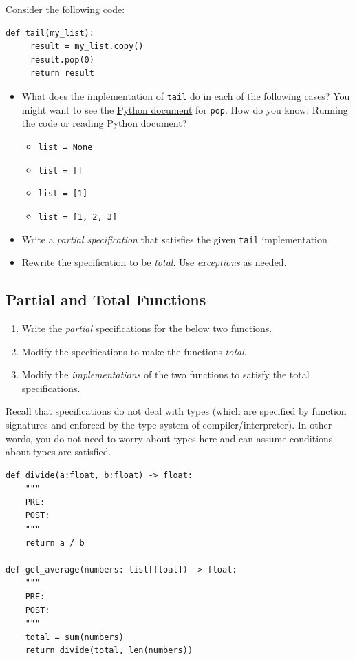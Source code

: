 \documentclass[oneside,11pt,dvipsnames]{book}
\newcommand{\code}[1]{\texttt{#1}}
\begin{document}
Consider the following code:

\begin{lstlisting}
def tail(my_list):
     result = my_list.copy()
     result.pop(0)
     return result
\end{lstlisting}

\begin{itemize}
     \item What does the implementation of \code{tail} do in each of the following cases? You might want to see the \href{https://docs.python.org/3/tutorial/datastructures.html}{Python document} for \code{pop}.  How do you know: Running the code or reading Python document?
     \begin{itemize}
         \item \code{list = None}
         \item \code{list = []}
         \item \code{list = [1]}  
         \item \code{list = [1, 2, 3]}
     \end{itemize}
     \item Write a \emph{partial specification} that satisfies the given \code{tail} implementation
     \item Rewrite the specification to be \emph{total}. Use \emph{exceptions} as needed.
    \end{itemize}

\subsection{Partial and Total Functions}\label{exercise:partial-total}

\begin{enumerate}
    \item Write the \emph{partial} specifications for the below two functions.
    \item Modify the specifications to make the functions \emph{total}.
    \item Modify the \emph{implementations} of the two functions to satisfy the total specifications.
\end{enumerate}

Recall that specifications do not deal with types (which are specified by  function signatures and enforced by the type system of compiler/interpreter).  In other words, you do not need to worry about types here and can assume conditions about types are satisfied.

\begin{lstlisting}
def divide(a:float, b:float) -> float:
    """
    PRE:
    POST:
    """
    return a / b

def get_average(numbers: list[float]) -> float:
    """
    PRE:
    POST:
    """
    total = sum(numbers)
    return divide(total, len(numbers))
\end{lstlisting}
\end{document}
